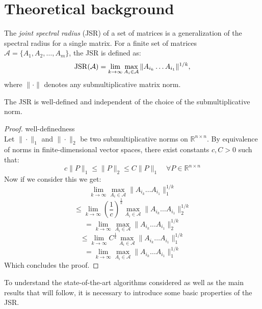 \section{Theoretical background}

The \emph{joint spectral radius} (JSR) of a set of matrices is a generalization of the spectral radius for a single matrix. For a finite set of matrices $\mathcal{A} = \{A_1, A_2, \dots, A_m\}$, the JSR is defined as:
\begin{equation}
    \operatorname{JSR}(\mathcal{A}) = \lim_{k \to \infty} \max_{A_i \in \mathcal{A}} \|A_{i_k} \dots A_{i_1}\|^{1/k},
\end{equation}
where $\|\cdot\|$ denotes any submultiplicative matrix norm.

\begin{theorem}
    The JSR is well-defined and independent of the choice of the submultiplicative norm.
\end{theorem}

\begin{proof}{well-definedness\\}
Let $\| \cdot \|_1$   and $ \| \cdot \|_2 $ be two submultiplicative norms on $ \mathbb{R}^{n \times n} $. By equivalence of norms in finite-dimensional vector spaces, there exist constants $ c, C > 0 $ such that:
$$
c \|P\|_1 \leq \|P\|_2 \leq C \|P\|_1 \quad \forall P \in \mathbb{R}^{n \times n}
$$
Now if we consider this we get: 
$$
\lim_{k \to \infty} \max_{A_i \in \mathcal{A}} \|A_{i_k} \dots A_{i_1}\|_{1}^{1/k} 
$$
$$
\le \lim_{k \to \infty} {(\frac{1}{c})}^{\frac{1}{k}} \max_{A_i \in \mathcal{A}} \|A_{i_k} \dots A_{i_1}\|_{2}^{1/k} 
$$
$$
= \lim_{k \to \infty} \max_{A_i \in \mathcal{A}} \|A_{i_k} \dots A_{i_1}\|_{2}^{1/k} 
$$
$$
\le \lim_{k \to \infty} {C}^{\frac{1}{k}} \max_{A_i \in \mathcal{A}} \|A_{i_k} \dots A_{i_1}\|_{1}^{1/k}
$$
$$
= \lim_{k \to \infty} \max_{A_i \in \mathcal{A}} \|A_{i_k} \dots A_{i_1}\|_{1}^{1/k}
$$
Which concludes the proof.
\end{proof}

To understand the state-of-the-art algorithms considered as well as the main results that will follow, it is necessary to introduce some basic properties of the JSR.

